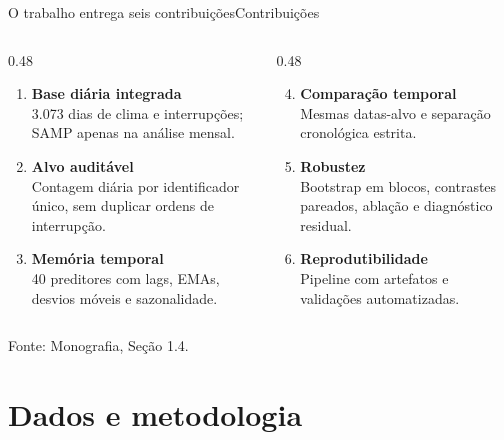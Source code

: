 \documentclass[10pt]{beamer}
\newcommand{\source}[1]{%
  \par\vfill{\raggedleft\tiny\color{gray}Fonte: #1\par}%
}
\begin{document}
\begin{frame}{O trabalho entrega seis contribuições}{Contribuições}
  \begin{columns}[T,onlytextwidth]
    \begin{column}{0.48\textwidth}
      \begin{enumerate}
        \item \textbf{Base diária integrada}\\
        3.073 dias de clima e interrupções; SAMP apenas na análise mensal.
        \item \textbf{Alvo auditável}\\
        Contagem diária por identificador único, sem duplicar ordens de interrupção.
        \item \textbf{Memória temporal}\\
        40 preditores com lags, EMAs, desvios móveis e sazonalidade.
      \end{enumerate}
    \end{column}
    \begin{column}{0.48\textwidth}
      \begin{enumerate}
        \setcounter{enumi}{3}
        \item \textbf{Comparação temporal}\\
        Mesmas datas-alvo e separação cronológica estrita.
        \item \textbf{Robustez}\\
        Bootstrap em blocos, contrastes pareados, ablação e diagnóstico residual.
        \item \textbf{Reprodutibilidade}\\
        Pipeline com artefatos e validações automatizadas.
      \end{enumerate}
    \end{column}
  \end{columns}

  \source{Monografia, Seção 1.4.}
\end{frame}


\section{Dados e metodologia}
\end{document}
